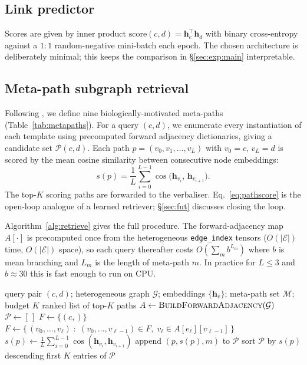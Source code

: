 \documentclass{article}
\begin{document}
\subsection{Link predictor}
Scores are given by inner product $\mathrm{score}(c,d) = \mathbf{h}_c^{\top}\mathbf{h}_d$ with binary cross-entropy against a $1{:}1$ random-negative mini-batch each epoch. The chosen architecture is deliberately minimal; this keeps the comparison in \S\ref{sec:exp:main} interpretable.

\subsection{Meta-path subgraph retrieval}
\label{sec:method:retrieval}
Following \citet{himmelstein2017}, we define nine biologically-motivated meta-paths (Table~\ref{tab:metapaths}). For a query $(c,d)$, we enumerate every instantiation of each template using precomputed forward adjacency dictionaries, giving a candidate set $\mathcal{P}(c,d)$. Each path $p=(v_0,v_1,\ldots,v_L)$ with $v_0{=}c,\,v_L{=}d$ is scored by the mean cosine similarity between consecutive node embeddings:
\begin{equation}
s(p) = \frac{1}{L}\sum_{i=0}^{L-1} \cos\!\bigl(\mathbf{h}_{v_i},\,\mathbf{h}_{v_{i+1}}\bigr).
\label{eq:pathscore}
\end{equation}
The top-$K$ scoring paths are forwarded to the verbaliser. Eq.~\eqref{eq:pathscore} is the open-loop analogue of a learned retriever; \S\ref{sec:fut} discusses closing the loop.

Algorithm~\ref{alg:retrieve} gives the full procedure. The forward-adjacency map $A[\cdot]$ is precomputed once from the heterogeneous \texttt{edge\_index} tensors ($O(|\mathcal{E}|)$ time, $O(|\mathcal{E}|)$ space), so each query thereafter costs $O(\sum_m b^{L_m})$ where $b$ is mean branching and $L_m$ is the length of meta-path $m$. In practice for $L{\le}3$ and $b{\approx}30$ this is fast enough to run on CPU.

\begin{algorithm}[t]
\small
\caption{\textsc{RetrieveTopK}: cosine-scored meta-path subgraph retrieval}
\label{alg:retrieve}
\begin{algorithmic}[1]
\Require query pair $(c,d)$; heterogeneous graph $\mathcal{G}$; embeddings $\{\mathbf{h}_v\}$; meta-path set $\mathcal{M}$; budget $K$
\Ensure ranked list of top-$K$ paths
\State $A\gets \textsc{BuildForwardAdjacency}(\mathcal{G})$ 
\State $\mathcal{P}\gets [\,]$
  \State $F\gets\{(c,)\}$ 
    \State $F\gets\{\,(v_0,\ldots,v_\ell)\;:\;(v_0,\ldots,v_{\ell-1})\in F,\;v_\ell\in A[e_\ell][v_{\ell-1}]\,\}$
  \EndFor
    \State $s(p)\gets \frac{1}{L}\sum_{i=0}^{L-1}\cos(\mathbf{h}_{v_i},\mathbf{h}_{v_{i+1}})$
    \State append $(p,s(p),m)$ to $\mathcal{P}$
  \EndFor
\EndFor
\State sort $\mathcal{P}$ by $s(p)$ descending
\State \Return first $K$ entries of $\mathcal{P}$
\end{algorithmic}
\end{algorithm}
\end{document}
